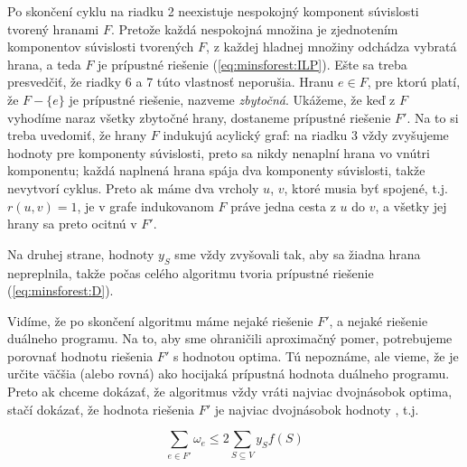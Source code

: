 \begin{dokaz}
Po skončení cyklu na riadku 2 neexistuje nespokojný komponent súvislosti tvorený hranami $F$. Pretože každá 
nespokojná množina je zjednotením komponentov súvislosti tvorených $F$, z každej hladnej množiny odchádza 
vybratá hrana, a teda $F$ je prípustné riešenie  (\ref{eq:minsforest:ILP}). Ešte sa treba presvedčiť, že
riadky 6 a 7 túto vlastnosť neporušia. Hranu $e\in F$, pre ktorú platí, že $F-\{e\}$ je prípustné riešenie,
nazveme {\em zbytočná}. Ukážeme, že keď z $F$ vyhodíme naraz všetky zbytočné hrany, dostaneme prípustné
riešenie $F'$. Na to si treba uvedomiť, že hrany $F$ indukujú acylický graf: na riadku 3 vždy zvyšujeme
hodnoty pre komponenty súvislosti, preto sa nikdy nenaplní hrana vo vnútri komponentu; každá naplnená hrana
spája dva komponenty súvislosti, takže nevytvorí cyklus. Preto ak máme dva vrcholy $u$, $v$, ktoré
musia byť spojené, t.j. $r(u,v)=1$, je v grafe indukovanom $F$ práve jedna cesta z $u$ do $v$, a všetky
jej hrany sa preto ocitnú v $F'$.

Na druhej strane, hodnoty $y_S$ sme vždy zvyšovali tak, aby sa žiadna hrana nepreplnila, takže počas celého 
algoritmu tvoria prípustné riešenie  (\ref{eq:minsforest:D}).
\end{dokaz}

\noindent Vidíme, že po skončení algoritmu máme nejaké riešenie $F'$, a nejaké
riešenie  duálneho programu.  Na to, aby sme ohraničili aproximačný
pomer, potrebujeme porovnať hodnotu riešenia $F'$ s hodnotou optima.  Tú
nepoznáme, ale vieme, že je určite väčšia (alebo rovná) ako hocijaká prípustná
hodnota duálneho programu.  Preto ak chceme dokázať, že algoritmus vždy vráti
najviac dvojnásobok optima, stačí dokázať, že hodnota riešenia $F'$ je najviac
dvojnásobok hodnoty , t.j.

\begin{veta}
  $$\sum_{e\in F'}\omega_e \le 2 \sum_{S\subseteq V}y_Sf(S)$$
\end{veta}

